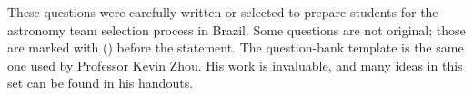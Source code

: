 \documentclass[11pt]{article}
\begin{document}

These questions were carefully written or selected to prepare students for the astronomy team selection process in Brazil. Some questions are not original; those are marked with () before the statement. The question-bank template is the same one used by Professor Kevin Zhou. His work is invaluable, and many ideas in this set can be found in his handouts.




\end{document}
